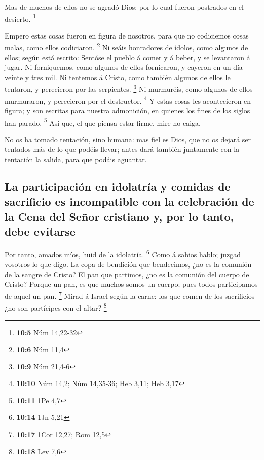  Mas de muchos de ellos no se agradó Dios; por lo cual
fueron postrados en el desierto. \footnote{\textbf{10:5} Núm 14,22-32}

 Empero estas cosas fueron en figura de nosotros, para que
no codiciemos cosas malas, como ellos codiciaron. \footnote{\textbf{10:6}
  Núm 11,4}  Ni seáis honradores de ídolos, como algunos de
ellos; según está escrito: Sentóse el pueblo á comer y á beber, y se
levantaron á jugar.  Ni forniquemos, como algunos de ellos
fornicaron, y cayeron en un día veinte y tres mil.  Ni
tentemos á Cristo, como también algunos de ellos le tentaron, y
perecieron por las serpientes. \footnote{\textbf{10:9} Núm 21,4-6}
 Ni murmuréis, como algunos de ellos murmuraron, y
perecieron por el destructor. \footnote{\textbf{10:10} Núm 14,2; Núm
  14,35-36; Heb 3,11; Heb 3,17}  Y estas cosas les
acontecieron en figura; y son escritas para nuestra admonición, en
quienes los fines de los siglos han parado. \footnote{\textbf{10:11} 1Pe
  4,7}  Así que, el que piensa estar firme, mire no caiga.

 No os ha tomado tentación, sino humana: mas fiel es Dios,
que no os dejará ser tentados más de lo que podéis llevar; antes dará
también juntamente con la tentación la salida, para que podáis aguantar.

\hypertarget{la-participaciuxf3n-en-idolatruxeda-y-comidas-de-sacrificio-es-incompatible-con-la-celebraciuxf3n-de-la-cena-del-seuxf1or-cristiano-y-por-lo-tanto-debe-evitarse}{%
\subsection{La participación en idolatría y comidas de sacrificio es
incompatible con la celebración de la Cena del Señor cristiano y, por lo
tanto, debe
evitarse}\label{la-participaciuxf3n-en-idolatruxeda-y-comidas-de-sacrificio-es-incompatible-con-la-celebraciuxf3n-de-la-cena-del-seuxf1or-cristiano-y-por-lo-tanto-debe-evitarse}}

 Por tanto, amados míos, huid de la idolatría. \footnote{\textbf{10:14}
  1Jn 5,21}  Como á sabios hablo; juzgad vosotros lo que
digo.  La copa de bendición que bendecimos, ¿no es la
comunión de la sangre de Cristo? El pan que partimos, ¿no es la comunión
del cuerpo de Cristo?  Porque un pan, es que muchos somos
un cuerpo; pues todos participamos de aquel un pan. \footnote{\textbf{10:17}
  1Cor 12,27; Rom 12,5}  Mirad á Israel según la carne: los
que comen de los sacrificios ¿no son partícipes con el altar?
\footnote{\textbf{10:18} Lev 7,6}

